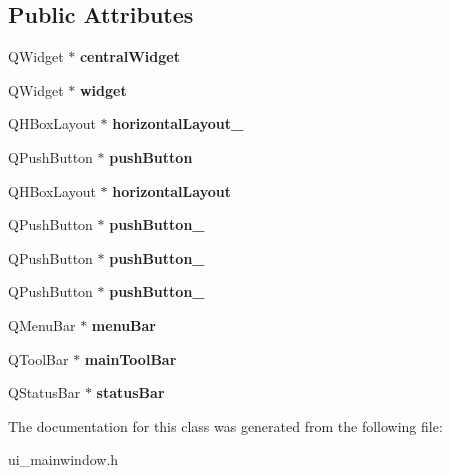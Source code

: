 \subsection*{Public Attributes}
\begin{DoxyCompactItemize}
\item 
\hypertarget{class_ui___main_window_a30075506c2116c3ed4ff25e07ae75f81}{Q\-Widget $\ast$ {\bfseries central\-Widget}}\label{class_ui___main_window_a30075506c2116c3ed4ff25e07ae75f81}

\item 
\hypertarget{class_ui___main_window_ab676f235c393f334b7c07935d4007925}{Q\-Widget $\ast$ {\bfseries widget}}\label{class_ui___main_window_ab676f235c393f334b7c07935d4007925}

\item 
\hypertarget{class_ui___main_window_a80867018070156432923d0266cc9fe25}{Q\-H\-Box\-Layout $\ast$ {\bfseries horizontal\-Layout\-\_}}\label{class_ui___main_window_a80867018070156432923d0266cc9fe25}

\item 
\hypertarget{class_ui___main_window_ad332d93084584930878f1daf5f84cdbf}{Q\-Push\-Button $\ast$ {\bfseries push\-Button}}\label{class_ui___main_window_ad332d93084584930878f1daf5f84cdbf}

\item 
\hypertarget{class_ui___main_window_acd6fdc9ebacc4b25b834162380d75ce8}{Q\-H\-Box\-Layout $\ast$ {\bfseries horizontal\-Layout}}\label{class_ui___main_window_acd6fdc9ebacc4b25b834162380d75ce8}

\item 
\hypertarget{class_ui___main_window_ac92cce0478c1025ace05ff4f8870bb1c}{Q\-Push\-Button $\ast$ {\bfseries push\-Button\-\_}}\label{class_ui___main_window_ac92cce0478c1025ace05ff4f8870bb1c}

\item 
\hypertarget{class_ui___main_window_a59a7d8124bce933d63f53f2153d447b4}{Q\-Push\-Button $\ast$ {\bfseries push\-Button\-\_}}\label{class_ui___main_window_a59a7d8124bce933d63f53f2153d447b4}

\item 
\hypertarget{class_ui___main_window_acb0b2f196dc2224f287b67594233297f}{Q\-Push\-Button $\ast$ {\bfseries push\-Button\-\_}}\label{class_ui___main_window_acb0b2f196dc2224f287b67594233297f}

\item 
\hypertarget{class_ui___main_window_a2be1c24ec9adfca18e1dcc951931457f}{Q\-Menu\-Bar $\ast$ {\bfseries menu\-Bar}}\label{class_ui___main_window_a2be1c24ec9adfca18e1dcc951931457f}

\item 
\hypertarget{class_ui___main_window_a5172877001c8c7b4e0f6de50421867d1}{Q\-Tool\-Bar $\ast$ {\bfseries main\-Tool\-Bar}}\label{class_ui___main_window_a5172877001c8c7b4e0f6de50421867d1}

\item 
\hypertarget{class_ui___main_window_a50fa481337604bcc8bf68de18ab16ecd}{Q\-Status\-Bar $\ast$ {\bfseries status\-Bar}}\label{class_ui___main_window_a50fa481337604bcc8bf68de18ab16ecd}

\end{DoxyCompactItemize}


The documentation for this class was generated from the following file\-:\begin{DoxyCompactItemize}
\item 
ui\-\_\-mainwindow.\-h\end{DoxyCompactItemize}
